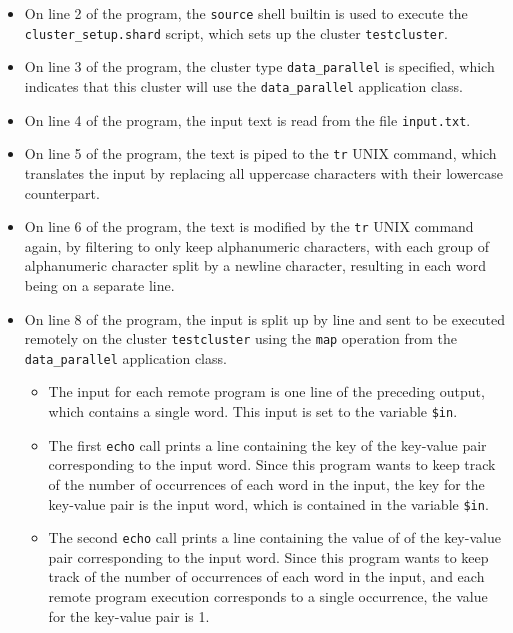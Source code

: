 \documentclass[twoside]{report}
\begin{document}
\begin{itemize}
  \item On line 2 of the program, the \texttt{source} shell builtin is used to execute the \texttt{cluster\_setup.shard} script, which sets up the cluster \texttt{testcluster}.
  \item On line 3 of the program, the cluster type \texttt{data\_parallel} is specified, which indicates that this cluster will use the \texttt{data\_parallel} application class.
  \item
        On line 4 of the program, the input text is read from the file \texttt{input.txt}.
  \item
        On line 5 of the program, the text is piped to the \texttt{tr} UNIX command, which translates the input by replacing all uppercase characters with their lowercase counterpart.
  \item
        On line 6 of the program, the text is modified by the \texttt{tr} UNIX command again, by filtering to only keep alphanumeric characters, with each group of alphanumeric character split by a newline character, resulting in each word being on a separate line.
  \item
        On line 8 of the program, the input is split up by line and sent to be executed remotely on the cluster \texttt{testcluster} using the \texttt{map} operation from the \texttt{data\_parallel} application class.
        \begin{itemize}
          \item The input for each remote program is one line of the preceding output, which contains a single word. This input is set to the variable \texttt{\$in}.
          \item The first \texttt{echo} call prints a line containing the key of the key-value pair corresponding to the input word.
                Since this program wants to keep track of the number of occurrences of each word in the input, the key for the key-value pair is the input word, which is contained in the variable \texttt{\$in}.
          \item The second \texttt{echo} call prints a line containing the value of of the key-value pair corresponding to the input word.
                Since this program wants to keep track of the number of occurrences of each word in the input, and each remote program execution corresponds to a single occurrence, the value for the key-value pair is 1.
        \end{itemize}


\end{itemize}
\end{document}
